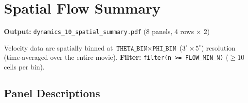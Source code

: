 \documentclass[11pt,a4paper]{article}
\newcommand{\param}[1]{\texttt{#1}}
\begin{document}
\section{Spatial Flow Summary}
\label{fig:spatial_flow}

\noindent\textbf{Output:} \texttt{dynamics\_10\_spatial\_summary.pdf}
(8 panels, 4 rows $\times$ 2)

Velocity data are spatially binned at
$\param{THETA\_BIN}\times\param{PHI\_BIN}$ ($3^\circ \times 5^\circ$)
resolution (time-averaged over the entire movie).
\textbf{Filter:} \texttt{filter(n >= FLOW\_MIN\_N)} ($\ge 10$ cells per bin).

\subsection*{Panel Descriptions}
\end{document}
